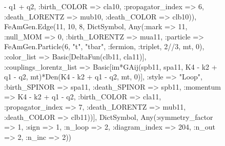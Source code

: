 \documentclass{revtex4}
\begin{document}
\begin{figure}[!htb]
\begin{center}
{- q1 + q2, :birth_COLOR => cla10, :propagator_index => 6, :death_LORENTZ => mub10, :death_COLOR => clb10)), FeAmGen.Edge(11, 10, 8, Dict{Symbol, Any}(:mark => 11, :null_MOM => 0, :birth_LORENTZ => mua11, :particle => FeAmGen.Particle(6, "t", "tbar", :fermion, :triplet, 2//3, mt, 0), :color_list => Basic[DeltaFun(clb11, cla11)], :couplings_lorentz_list => Basic[im*GAij(spb11, spa11, K4 - k2 + q1 - q2, mt)*Den(K4 - k2 + q1 - q2, mt, 0)], :style => "Loop", :birth_SPINOR => spa11, :death_SPINOR => spb11, :momentum => K4 - k2 + q1 - q2, :birth_COLOR => cla11, :propagator_index => 7, :death_LORENTZ => mub11, :death_COLOR => clb11))], Dict{Symbol, Any}(:symmetry_factor => 1, :sign => 1, :n_loop => 2, :diagram_index => 204, :n_out => 2, :n_inc => 2)) 
}
\end{center}
\end{figure}
\end{document}
